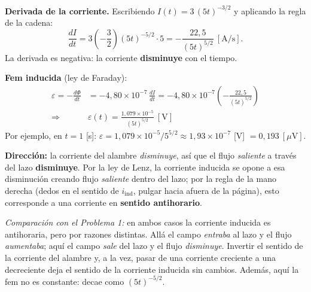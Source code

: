 \documentclass[12pt,letterpaper]{article}
\newcommand{\eps}{\varepsilon}
\begin{document}
\textbf{Derivada de la corriente.} Escribiendo $I(t) = 3\,(5t)^{-3/2}$ y aplicando la regla de la
cadena:
\[
    \frac{dI}{dt} = 3\left(-\frac{3}{2}\right)(5t)^{-5/2}\cdot 5 = -\frac{22{,}5}{(5t)^{5/2}}\ [\text{A/s}].
\]
La derivada es negativa: la corriente \textbf{disminuye} con el tiempo.

\medskip
\textbf{Fem inducida} (ley de Faraday):
\begin{align*}
    \eps = -\frac{d\Phi}{dt} &= -4{,}80\times10^{-7}\,\frac{dI}{dt}
          = -4{,}80\times10^{-7}\left(-\frac{22{,}5}{(5t)^{5/2}}\right)\\
    \Rightarrow\quad & \boxed{\eps(t) = \frac{1{,}079\times10^{-5}}{(5t)^{5/2}}\ [\text{V}]}
\end{align*}
Por ejemplo, en $t = 1$ [s]: $\eps = 1{,}079\times10^{-5}/5^{5/2} \approx 1{,}93\times10^{-7}$ [V]
$= 0{,}193\ [\mu\text{V}]$.

\medskip
\textbf{Direcci\'on:} la corriente del alambre \emph{disminuye}, as\'i que el flujo \emph{saliente} a
trav\'es del lazo \textbf{disminuye}. Por la ley de Lenz, la corriente inducida se opone a esa
disminuci\'on creando flujo \emph{saliente} dentro del lazo; por la regla de la mano derecha (dedos en
el sentido de $i_{\text{ind}}$, pulgar hacia afuera de la p\'agina), esto corresponde a una
corriente en \textbf{sentido antihorario}.

\medskip
\noindent\textit{Comparaci\'on con el Problema 1:} en ambos casos la corriente inducida es
antihoraria, pero por razones distintas. All\'a el campo \emph{entraba} al lazo y el flujo
\emph{aumentaba}; aqu\'i el campo \emph{sale} del lazo y el flujo \emph{disminuye}. Invertir el
sentido de la corriente del alambre y, a la vez, pasar de una corriente creciente a una decreciente
deja el sentido de la corriente inducida sin cambios. Adem\'as, aqu\'i la fem no es constante: decae
como $(5t)^{-5/2}$.
\end{document}
